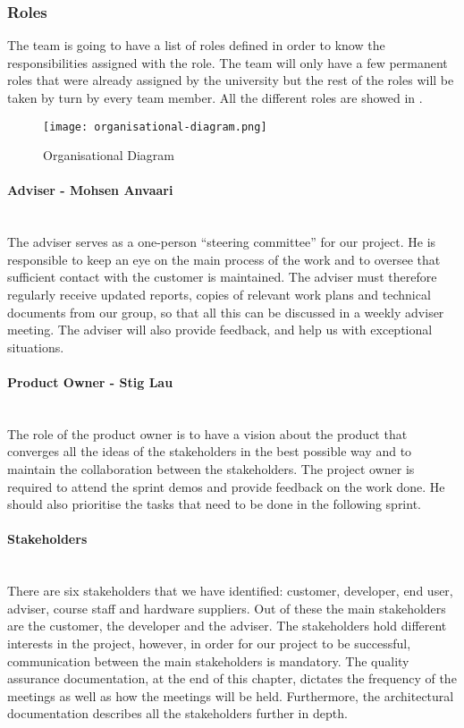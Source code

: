 \documentclass[../document.tex]{subfiles}
\begin{document}
\subsubsection{Roles}
The team is going to have a list of roles defined in order to know the responsibilities assigned with the role. The team will only have a few permanent roles that were already assigned by the university but the rest of the roles will be taken by turn by every team member. All the different roles are showed in .
\begin{figure}
\centering
\texttt{[image: organisational-diagram.png]}
\caption{Organisational Diagram}
\label{fig:organisational-diagram}
\end{figure}

\paragraph{Adviser - Mohsen Anvaari} \ \\
The adviser serves as a one-person “steering committee” for our project. He is responsible to keep an eye on the main process of the work and to oversee that sufficient contact with the customer is maintained. The adviser must therefore regularly receive updated reports, copies of relevant work plans and technical documents from our group, so that all this can be discussed in a weekly adviser meeting. The adviser will also provide feedback, and help us with exceptional situations.


\paragraph{Product Owner - Stig Lau} \ \\
The role of the product owner is to have a vision about the product that converges all the ideas of the stakeholders in the best possible way and to maintain the collaboration between the stakeholders. The project owner is required to attend the sprint demos and provide feedback on the work done. He should also prioritise the tasks that need to be done in the following sprint. 

\paragraph{Stakeholders} \ \\
There are six stakeholders that we have identified: customer, developer, end user, adviser, course staff and hardware suppliers. Out of these the main stakeholders are the customer, the developer and the adviser. The stakeholders hold different interests in the project, however, in order for our project to be successful, communication between the main stakeholders is mandatory. The quality assurance documentation, at the end of this chapter, dictates the frequency of the meetings as well as how the meetings will be held. Furthermore, the architectural documentation describes all the stakeholders further in depth.
\end{document}
